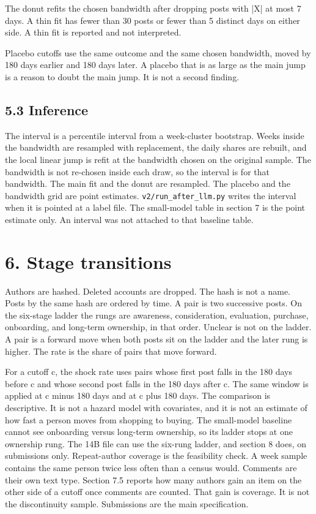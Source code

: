 \documentclass[11pt]{article}
\begin{document}
The donut refits the chosen bandwidth after dropping posts with |X| at most 7 days. A thin fit has fewer than 30 posts or fewer than 5 distinct days on either side. A thin fit is reported and not interpreted.


Placebo cutoffs use the same outcome and the same chosen bandwidth, moved by 180 days earlier and 180 days later. A placebo that is as large as the main jump is a reason to doubt the main jump. It is not a second finding.


\subsection{5.3 Inference}

The interval is a percentile interval from a week-cluster bootstrap. Weeks inside the bandwidth are resampled with replacement, the daily shares are rebuilt, and the local linear jump is refit at the bandwidth chosen on the original sample. The bandwidth is not re-chosen inside each draw, so the interval is for that bandwidth. The main fit and the donut are resampled. The placebo and the bandwidth grid are point estimates. \texttt{v2/run\_after\_llm.py} writes the interval when it is pointed at a label file. The small-model table in section 7 is the point estimate only. An interval was not attached to that baseline table.


\section{6. Stage transitions}

Authors are hashed. Deleted accounts are dropped. The hash is not a name. Posts by the same hash are ordered by time. A pair is two successive posts. On the six-stage ladder the rungs are awareness, consideration, evaluation, purchase, onboarding, and long-term ownership, in that order. Unclear is not on the ladder. A pair is a forward move when both posts sit on the ladder and the later rung is higher. The rate is the share of pairs that move forward.


For a cutoff c, the shock rate uses pairs whose first post falls in the 180 days before c and whose second post falls in the 180 days after c. The same window is applied at c minus 180 days and at c plus 180 days. The comparison is descriptive. It is not a hazard model with covariates, and it is not an estimate of how fast a person moves from shopping to buying. The small-model baseline cannot see onboarding versus long-term ownership, so its ladder stops at one ownership rung. The 14B file can use the six-rung ladder, and section 8 does, on submissions only. Repeat-author coverage is the feasibility check. A week sample contains the same person twice less often than a census would. Comments are their own text type. Section 7.5 reports how many authors gain an item on the other side of a cutoff once comments are counted. That gain is coverage. It is not the discontinuity sample. Submissions are the main specification.
\end{document}
